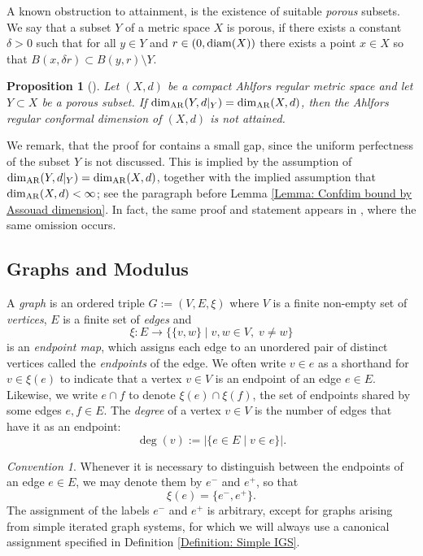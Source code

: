 \documentclass{amsart}
\newcommand{\diam}{{\rm diam}}
\newcommand{\AR}{{\rm AR}}
\newtheorem{proposition}[equation]{Proposition}
\numberwithin{equation}{section}
\theoremstyle{definition}
\theoremstyle{remark}
\newtheorem{convention}[equation]{Convention}
\begin{document}
A known obstruction to attainment, is the existence of suitable \emph{porous} subsets. We say that a subset \(Y\) of a metric space \(X\) is porous, if there exists a constant \(\delta>0\) such that for all \(y\in Y\) and \(r\in(0,\diam(X))\) there exists a point \(x\in X\) so that \(B(x,\delta r)\subset B(y,r)\setminus Y\). 


\begin{proposition}[{\cite[Proposition 2.9]{anttila2024constructions}}]
\label{Proposition: Porosity implies non-attainment}
    Let \((X,d)\) be a compact Ahlfors regular metric space and let \(Y\subset X\) be a porous subset. If \(\dim_\AR(Y,d\vert_Y)=\dim_\AR(X,d)\), then the Ahlfors regular conformal dimension of \((X,d)\) is not attained.
\end{proposition}

We remark, that the proof for \cite[Proposition 2.9]{anttila2024constructions} contains a small gap, since  the uniform perfectness of the subset $Y$ is not discussed. This is implied by the assumption of \(\dim_\AR(Y,d\vert_Y)=\dim_\AR(X,d)\), together with the implied assumption that \(\dim_\AR(X,d)<\infty\); see the paragraph before Lemma \ref{Lemma: Confdim bound by Assouad dimension}. In fact, the same proof and statement appears in \cite[Proposition 8.3]{CM}, where the same omission occurs. 



\subsection{Graphs and Modulus} A \emph{graph} is an ordered triple \(G:=(V,E,\xi)\) where \(V\) is a finite non-empty set of \emph{vertices}, \(E\) is a finite set of \emph{edges} and
    \[
        \xi\colon E\to\{\{v,w\}\mid v,w\in V, \;v\neq w\}
    \] 
is an \emph{endpoint map}, which assigns each edge to an unordered pair of distinct vertices called the \emph{endpoints} of the edge. We often write \(v\in e\) as a shorthand for \(v\in \xi(e)\) to indicate that a vertex \(v\in V\) is an endpoint of an edge \(e\in E\). Likewise, we write \(e\cap f\) to denote \(\xi(e)\cap \xi(f)\), the set of endpoints shared by some edges \(e,f\in E\). The \emph{degree} of a vertex \(v\in V\) is the number of edges that have it as an endpoint:
\[\deg(v):=\lvert\{e\in E\mid v\in e\}\rvert.\]


\begin{convention}
    Whenever it is necessary to distinguish between the endpoints of an edge \(e\in E\), we may denote them by \(e^-\) and \(e^+\), so that
        \[
        \xi(e)=\{e^-,e^+\}.
        \]
    The assignment of the labels \(e^-\) and \(e^+\) is arbitrary, except for graphs arising from simple iterated graph systems, for which we will always use a canonical assignment specified in Definition \ref{Definition: Simple IGS}.
\end{convention}
\end{document}

